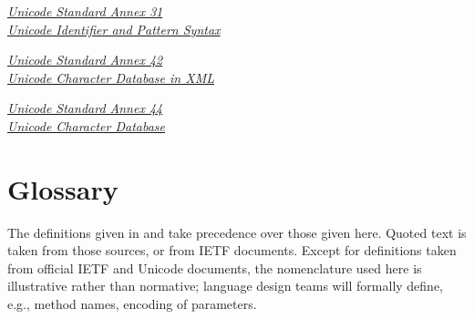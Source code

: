 \documentclass[b4paper]{article}
\begin{document}
\begin{thebibliography}{20}
\href{https://www.unicode.org/reports/tr31/}%
{\textit{Unicode{\textregistered} Standard Annex 31\\ %
Unicode Identifier and Pattern Syntax}}

\href{https://www.unicode.org/reports/tr42/tr42-34.html}%
{\textit{Unicode{\textregistered} Standard Annex 42\\ %
Unicode Character Database in XML}}

\href{https://www.unicode.org/reports/tr44/tr44-32.html}%
{\textit{Unicode{\textregistered} Standard Annex 44\\ %
Unicode Character Database}}

\end{thebibliography}


\section{Glossary}

The definitions given in \cite{Glossary} and \cite{Unicode} take
precedence over those given here. Quoted text is taken from those sources, or from IETF documents.
Except for definitions taken from official IETF and Unicode documents,
the nomenclature used here is illustrative rather than normative;
language design teams will formally define, e.g., method names, encoding of parameters.
\end{document}
